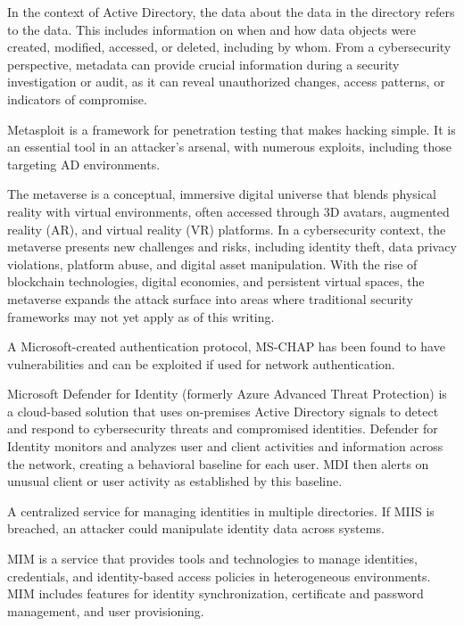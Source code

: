  In the context of Active Directory, the data about the data in the directory refers to the data. This includes information on when and how data objects were created, modified, accessed, or deleted, including by whom. From a cybersecurity perspective, metadata can provide crucial information during a security investigation or audit, as it can reveal unauthorized changes, access patterns, or indicators of compromise.

 Metasploit is a framework for penetration testing that makes hacking simple. It is an essential tool in an attacker’s arsenal, with numerous exploits, including those targeting AD environments.

 The metaverse is a conceptual, immersive digital universe that blends physical reality with virtual environments, often accessed through 3D avatars, augmented reality (AR), and virtual reality (VR) platforms. In a cybersecurity context, the metaverse presents new challenges and risks, including identity theft, data privacy violations, platform abuse, and digital asset manipulation. With the rise of blockchain technologies, digital economies, and persistent virtual spaces, the metaverse expands the attack surface into areas where traditional security frameworks may not yet apply as of this writing.

 A Microsoft-created authentication protocol, MS-CHAP has been found to have vulnerabilities and can be exploited if used for network authentication.

 Microsoft Defender for Identity (formerly Azure Advanced Threat Protection) is a cloud-based solution that uses on-premises Active Directory signals to detect and respond to cybersecurity threats and compromised identities. Defender for Identity monitors and analyzes user and client activities and information across the network, creating a behavioral baseline for each user. MDI then alerts on unusual client or user activity as established by this baseline.

 A centralized service for managing identities in multiple directories. If MIIS is breached, an attacker could manipulate identity data across systems.

 MIM is a service that provides tools and technologies to manage identities, credentials, and identity-based access policies in heterogeneous environments. MIM includes features for identity synchronization, certificate and password management, and user provisioning.

